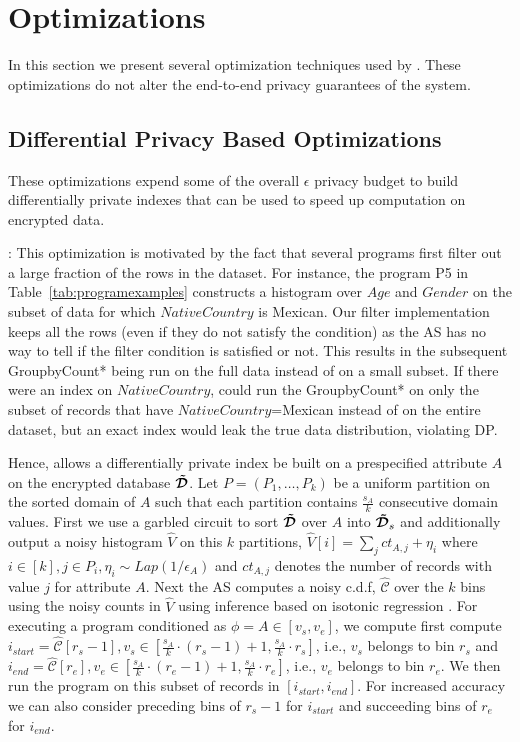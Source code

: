 \section{\system Optimizations}\label{sec:optimization}
In this section we present several optimization techniques used by \system. These optimizations do not alter the end-to-end privacy guarantees of the system. 
\subsection{Differential Privacy Based Optimizations}\label{sec:dp_optimization}
These optimizations expend some of the overall $\epsilon$ privacy budget to build differentially private indexes that can be used to speed up computation on encrypted data.

: This optimization is motivated by the fact that several programs first filter out a large fraction of the rows in the dataset. For instance, the program  P5 in Table~\ref{tab:programexamples} constructs a histogram over $Age$ and $Gender$ on the subset of data for which $NativeCountry$ is Mexican. Our filter implementation keeps all the rows (even if they do not satisfy the condition) as the \textsf{AS} has no way to tell if the filter condition is satisfied or not. This results in the subsequent GroupbyCount* being run on the full data instead of on a small subset. If there were an index on $NativeCountry$,  \system could run the GroupbyCount* on only the subset of records that have $NativeCountry$=Mexican instead of on the entire dataset, but an exact index would leak the true data distribution, violating DP. 

Hence, \system allows a differentially private index be built on a prespecified attribute $A$ on the encrypted database $\boldsymbol{\tilde{\mathcal{D}}}$.   Let $P=(P_1,\ldots,P_k)$ be a uniform partition on the sorted domain of $A$ such that each partition contains $\frac{s_A}{k}$ consecutive domain values. First we use a garbled circuit to sort $\boldsymbol{\tilde{\mathcal{D}}}$ over $A$ into $\boldsymbol{\tilde{\mathcal{D}}}_s$ and additionally output a noisy histogram $\hat{V}$ on this $k$ partitions, $\hat{V}[i]=\sum_j ct_{A,j}+\eta_i$ where $i \in [k], j \in P_i, \eta_i\sim Lap(1/\epsilon_A)$ and $ct_{A,j}$ denotes the number of records with value $j$ for attribute $A$. 
Next the \textsf{AS} computes a noisy c.d.f, $\hat{\mathcal{C}}$ over the $k$ bins using the noisy counts in $\hat{V}$ using inference based on isotonic regression \cite{cdf}. For executing a program conditioned as $\phi=A \in [v_s,v_e]$, we compute first compute $i_{start}=\hat{\mathcal{C}}[r_s-1], v_s \in [\frac{s_A}{k}\cdot(r_s-1)+1,\frac{s_A}{k}\cdot r_s]$, i.e., $v_s$ belongs to bin $r_s$   and  $i_{end}=\hat{\mathcal{C}}[r_e], v_e \in [\frac{s_A}{k}\cdot(r_e-1)+1,\frac{s_A}{k}\cdot r_e]$, i.e., $v_e$ belongs to bin $r_e$. We then run the program on this subset of records in $[i_{start},i_{end}]$. For increased accuracy we can also consider preceding bins of $r_s-1$ for $i_{start}$ and succeeding bins of $r_e$ for $i_{end}$.

